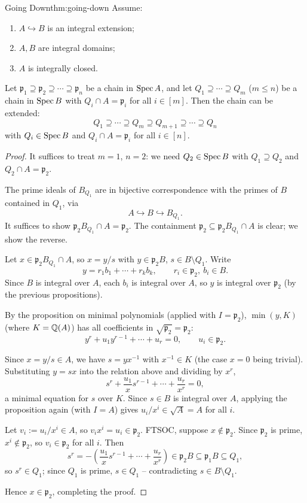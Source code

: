 \begin{theorem}{Going Down}{thm:going-down}
Assume:
\begin{enumerate}[label=(\alph*)]
    \item $A \hookrightarrow B$ is an integral extension;
    \item $A, B$ are integral domains;
    \item $A$ is integrally closed.
\end{enumerate}
Let $\mathfrak p_1 \supseteq \mathfrak p_2 \supseteq \cdots \supseteq \mathfrak p_n$ be a chain in $\operatorname{Spec} A$, and let $Q_1 \supseteq \cdots \supseteq Q_m$ ($m \leq n$) be a chain in $\operatorname{Spec} B$ with $Q_i \cap A = \mathfrak p_i$ for all $i \in [m]$. Then the chain can be extended:
\[
Q_1 \supseteq \cdots \supseteq Q_m \supseteq Q_{m+1} \supseteq \cdots \supseteq Q_n
\]
with $Q_i \in \operatorname{Spec} B$ and $Q_i \cap A = \mathfrak p_i$ for all $i \in [n]$.
\end{theorem}

\begin{proof}
It suffices to treat $m=1$, $n=2$: we need $Q_2 \in \operatorname{Spec} B$ with $Q_1 \supseteq Q_2$ and $Q_2 \cap A = \mathfrak p_2$.

The prime ideals of $B_{Q_1}$ are in bijective correspondence with the primes of $B$ contained in $Q_1$, via
\[
A \hookrightarrow B \hookrightarrow B_{Q_1}.
\]
It suffices to show $\mathfrak p_2 B_{Q_1} \cap A = \mathfrak p_2$. The containment $\mathfrak p_2 \subseteq \mathfrak p_2 B_{Q_1} \cap A$ is clear; we show the reverse.

Let $x \in \mathfrak p_2 B_{Q_1} \cap A$, so $x = y/s$ with $y \in \mathfrak p_2 B$, $s \in B \setminus Q_1$. Write
\[
y = r_1 b_1 + \cdots + r_k b_k, \qquad r_i \in \mathfrak p_2,\ b_i \in B.
\]
Since $B$ is integral over $A$, each $b_i$ is integral over $A$, so $y$ is integral over $\mathfrak p_2$ (by the previous propositions).

By the proposition on minimal polynomials (applied with $I=\mathfrak p_2$), $\min(y,K)$ (where $K = \mathbb{Q}(A)$) has all coefficients in $\sqrt{\mathfrak p_2} = \mathfrak p_2$:
\[
y^r + u_1y^{r-1} + \cdots + u_r = 0, \qquad u_i \in \mathfrak p_2.
\]

Since $x = y/s \in A$, we have $s = yx^{-1}$ with $x^{-1} \in K$ (the case $x=0$ being trivial). Substituting $y=sx$ into the relation above and dividing by $x^r$,
\[
s^r + \frac{u_1}{x}s^{r-1} + \cdots + \frac{u_r}{x^r} = 0,
\]
a minimal equation for $s$ over $K$. Since $s \in B$ is integral over $A$, applying the proposition again (with $I=A$) gives $u_i/x^i \in \sqrt A = A$ for all $i$.

Let $v_i := u_i/x^i \in A$, so $v_i x^i = u_i \in \mathfrak p_2$. FTSOC, suppose $x \notin \mathfrak p_2$. Since $\mathfrak p_2$ is prime, $x^i \notin \mathfrak p_2$, so $v_i \in \mathfrak p_2$ for all $i$. Then
\[
s^r = -\left(\frac{u_1}{x}s^{r-1} + \cdots + \frac{u_r}{x^r}\right) \in \mathfrak p_2 B \subseteq \mathfrak p_1 B \subseteq Q_1,
\]
so $s^r \in Q_1$; since $Q_1$ is prime, $s \in Q_1$ -- contradicting $s \in B\setminus Q_1$.

Hence $x \in \mathfrak p_2$, completing the proof.
\end{proof}

